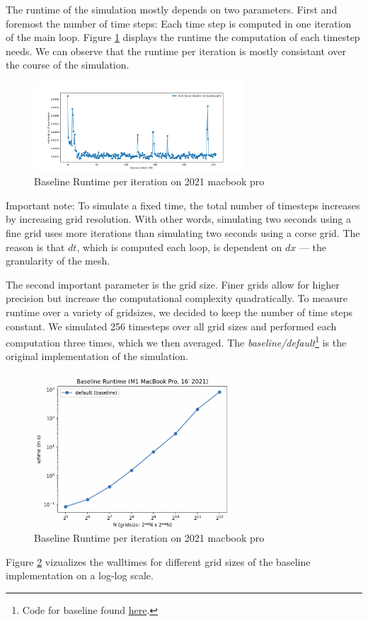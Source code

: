 \documentclass[a4paper,10pt]{article}
\begin{document}
The runtime of the simulation mostly depends on two parameters.
First and foremost the number of time steps:
Each time step is computed in one iteration of the main loop.
Figure \ref{fig:runtime_per_iteration} displays the runtime the computation of each timestep needs.
We can observe that the runtime per iteration is mostly consistant over the course of the simulation.
\begin{figure}[h]
  \centering
  \includegraphics[width=0.7\textwidth]{images/baseline/baseline_per_iteration_macair.png}
  \caption{Baseline Runtime per iteration on 2021 macbook pro}
  \label{fig:runtime_per_iteration}
\end{figure}
Important note:
To simulate a fixed time, the total number of timesteps increases by increasing grid resolution.
With other words, simulating two seconds using a fine grid uses more iterations than simulating two seconds using a corse grid. 
The reason is that $dt$, which is computed each loop, is dependent on $dx$ --- the granularity of the mesh.

The second important parameter is the grid size.
Finer grids allow for higher precision but increase the computational complexity quadratically.
To measure runtime over a variety of gridsizes, we decided to keep the number of time steps constant.
We simulated 256 timesteps over all grid sizes and performed each computation three times, which we then averaged.
The \textit{baseline/default}\footnote{Code for baseline found \href{https://github.com/paulmyr/DD2358-HPC25/blob/master/10_project_rishi_paul/code/finitevolume_runtimeplots.py}{here}.} is the original implementation of the simulation.
\begin{figure}[h]
  \centering
  \includegraphics[width=0.7\textwidth]{images/baseline/baseline_performance.png}
  \caption{Baseline Runtime per iteration on 2021 macbook pro}
  \label{fig:runtime_baseline}
\end{figure}
Figure \ref{fig:runtime_baseline} vizualizes the walltimes for different grid sizes of the baseline implementation on a log-log scale.
\end{document}
